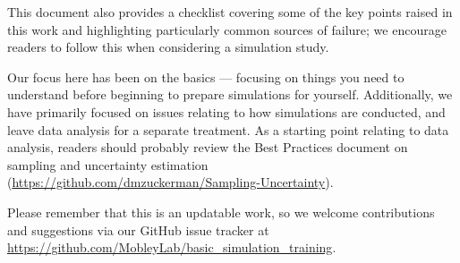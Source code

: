 \documentclass[9pt,bestpractices]{livecoms}
\begin{document}
This document also provides a checklist covering some of the key points raised in this work and highlighting particularly common sources of failure; we encourage readers to follow this when considering a simulation study.

Our focus here has been on the basics --- focusing on things you need to understand before beginning to prepare simulations for yourself.
Additionally, we have primarily focused on issues relating to how simulations are conducted, and leave data analysis for a separate treatment.
As a starting point relating to data analysis, readers should probably review the Best Practices document on sampling and uncertainty estimation (\url{https://github.com/dmzuckerman/Sampling-Uncertainty}).

Please remember that this is an updatable work, so we welcome contributions and suggestions via our GitHub issue tracker at \url{https://github.com/MobleyLab/basic_simulation_training}.



\nocite{*}
{}
\end{document}
